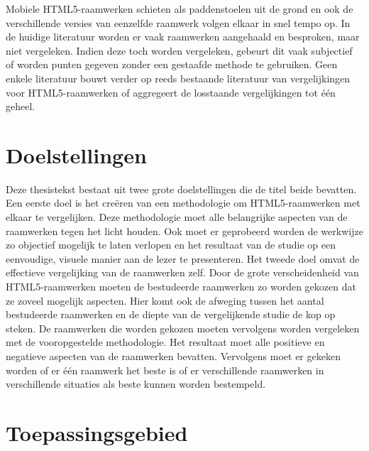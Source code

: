 Mobiele HTML5-raamwerken schieten als paddenstoelen uit de grond en ook de verschillende versies van eenzelfde raamwerk volgen elkaar in snel tempo op.
In de huidige literatuur worden er vaak raamwerken aangehaald en besproken, maar niet vergeleken.
Indien deze toch worden vergeleken, gebeurt dit vaak subjectief of worden punten gegeven zonder een gestaafde methode te gebruiken.
Geen enkele literatuur bouwt verder op reeds bestaande literatuur van vergelijkingen voor HTML5-raamwerken of aggregeert de losstaande vergelijkingen tot één geheel.

\section{Doelstellingen}

Deze thesistekst bestaat uit twee grote doelstellingen die de titel beide bevatten.
Een eerste doel is het creëren van een methodologie om HTML5-raamwerken met elkaar te vergelijken.
Deze methodologie moet alle belangrijke aspecten van de raamwerken tegen het licht houden.
Ook moet er geprobeerd worden de werkwijze zo objectief mogelijk te laten verlopen en het resultaat van de studie op een eenvoudige,  visuele manier aan de lezer te presenteren.
Het tweede doel omvat de effectieve vergelijking van de raamwerken zelf.
Door de grote verscheidenheid van HTML5-raamwerken moeten de bestudeerde raamwerken zo worden gekozen dat ze zoveel mogelijk aspecten.
Hier komt ook de afweging tussen het aantal bestudeerde raamwerken en de diepte van de vergelijkende studie de kop op steken.
De raamwerken die worden gekozen moeten vervolgens worden vergeleken met de vooropgestelde methodologie.
Het resultaat moet alle positieve en negatieve aspecten van de raamwerken bevatten.
Vervolgens moet er gekeken worden of er één raamwerk het beste is of er verschillende raamwerken in verschillende situaties als beste kunnen worden bestempeld.

\section{Toepassingsgebied}

